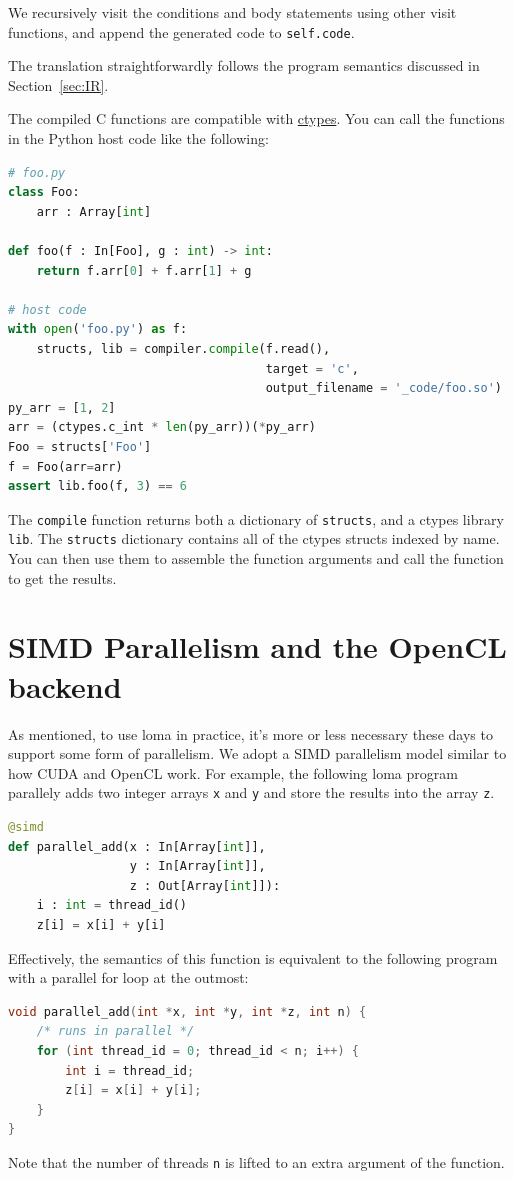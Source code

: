We recursively visit the conditions and body statements using other visit functions, and append the generated code to \lstinline{self.code}.

The translation straightforwardly follows the program semantics discussed in Section~\ref{sec:IR}.

The compiled C functions are compatible with \href{https://docs.python.org/3/library/ctypes.html}{ctypes}. You can call the functions in the Python host code like the following:
\begin{lstlisting}[language=python]
# foo.py
class Foo:
    arr : Array[int]

def foo(f : In[Foo], g : int) -> int:
    return f.arr[0] + f.arr[1] + g

# host code
with open('foo.py') as f:
    structs, lib = compiler.compile(f.read(),
                                    target = 'c',
                                    output_filename = '_code/foo.so')
py_arr = [1, 2]
arr = (ctypes.c_int * len(py_arr))(*py_arr)
Foo = structs['Foo']
f = Foo(arr=arr)
assert lib.foo(f, 3) == 6
\end{lstlisting}

The \lstinline{compile} function returns both a dictionary of \lstinline{structs}, and a ctypes library \lstinline{lib}. The \lstinline{structs} dictionary contains all of the ctypes structs indexed by name. You can then use them to assemble the function arguments and call the function to get the results.

\section{SIMD Parallelism and the OpenCL backend}

As mentioned, to use loma in practice, it's more or less necessary these days to support some form of parallelism. We adopt a SIMD parallelism model similar to how CUDA and OpenCL work. For example, the following loma program parallely adds two integer arrays \lstinline{x} and \lstinline{y} and store the results into the array \lstinline{z}.
\begin{lstlisting}[language=python] 
@simd
def parallel_add(x : In[Array[int]],
                 y : In[Array[int]],
                 z : Out[Array[int]]):
    i : int = thread_id()
    z[i] = x[i] + y[i]
\end{lstlisting}

Effectively, the semantics of this function is equivalent to the following program with a parallel for loop at the outmost:
\begin{lstlisting}[language=c]
void parallel_add(int *x, int *y, int *z, int n) {
    /* runs in parallel */
    for (int thread_id = 0; thread_id < n; i++) {
        int i = thread_id;
        z[i] = x[i] + y[i];
    }
}
\end{lstlisting}
Note that the number of threads \lstinline{n} is lifted to an extra argument of the function.


